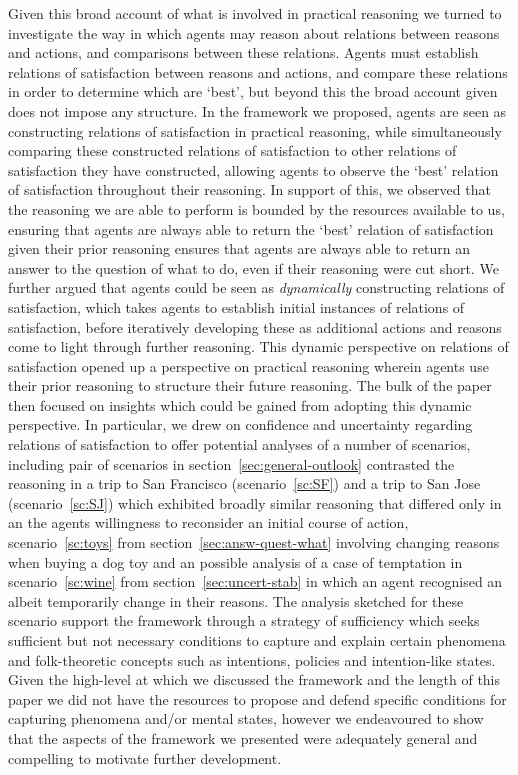 \documentclass[10pt]{article}
\begin{document}
Given this broad account of what is involved in practical reasoning we turned to investigate the way in which agents may reason about relations between reasons and actions, and comparisons between these relations.
Agents must establish relations of satisfaction between reasons and actions, and compare these relations in order to determine which are `best', but beyond this the broad account given does not impose any structure.
In the framework we proposed, agents are seen as constructing relations of satisfaction in practical reasoning, while simultaneously comparing these constructed relations of satisfaction to other relations of satisfaction they have constructed, allowing agents to observe the `best' relation of satisfaction throughout their reasoning.
In support of this, we observed that the reasoning we are able to perform is bounded by the resources available to us, ensuring that agents are always able to return the `best' relation of satisfaction given their prior reasoning ensures that agents are always able to return an answer to the question of what to do, even if their reasoning were cut short.
We further argued that agents could be seen as \emph{dynamically} constructing relations of satisfaction, which takes agents to establish initial instances of relations of satisfaction, before iteratively developing these as additional actions and reasons come to light through further reasoning.
This dynamic perspective on relations of satisfaction opened up a perspective on practical reasoning wherein agents use their prior reasoning to structure their future reasoning.
The bulk of the paper then focused on insights which could be gained from adopting this dynamic perspective.
In particular, we drew on confidence and uncertainty regarding relations of satisfaction to offer potential analyses of a number of scenarios, including pair of scenarios in section~\ref{sec:general-outlook} contrasted the reasoning in a trip to San Francisco (scenario~\ref{sc:SF}) and a trip to San Jose (scenario~\ref{sc:SJ}) which exhibited broadly similar reasoning that differed only in an the agents willingness to reconsider an initial course of action, scenario~\ref{sc:toys} from section~\ref{sec:answ-quest-what} involving changing reasons when buying a dog toy and an possible analysis of a case of temptation in scenario~\ref{sc:wine} from section~\ref{sec:uncert-stab} in which an agent recognised an albeit temporarily change in their reasons.
The analysis sketched for these scenario support the framework through a strategy of sufficiency which seeks sufficient but not necessary conditions to capture and explain certain phenomena and folk-theoretic concepts such as intentions, policies and intention-like states.
Given the high-level at which we discussed the framework and the length of this paper we did not have the resources to propose and defend specific conditions for capturing phenomena and/or mental states, however we endeavoured to show that the aspects of the framework we presented were adequately general and compelling to motivate further development.
\end{document}
